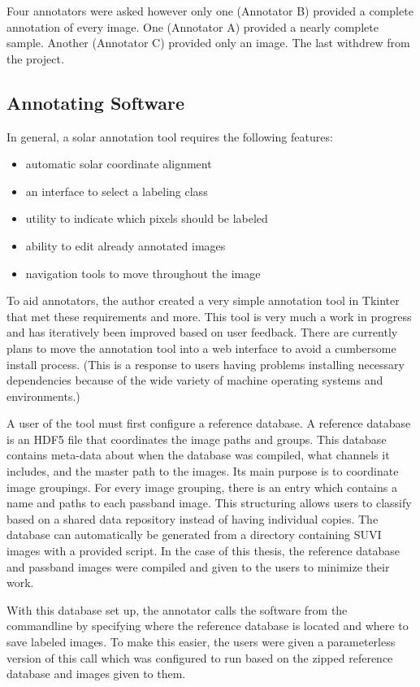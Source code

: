 \documentclass[twoside]{report}
\begin{document}
Four annotators were asked however only one (Annotator B) provided a complete annotation of every image. One (Annotator A) provided a nearly complete sample. Another (Annotator C) provided only an image. The last withdrew from the project. 

\subsection{Annotating Software}\label{sec:annotatesoftware}
In general, a solar annotation tool requires the following features:
\begin{itemize}
\item automatic solar coordinate alignment 
\item an interface to select a labeling class
\item utility to indicate which pixels should be labeled
\item ability to edit already annotated images
\item navigation tools to move throughout the image
\end{itemize}

To aid annotators, the author created a very simple annotation tool in Tkinter that met these requirements and more. This tool is very much a work in progress and has iteratively been improved based on user feedback. There are currently plans to move the annotation tool into a web interface to avoid a cumbersome install process. (This is a response to users having problems installing necessary dependencies because of the wide variety of machine operating systems and environments.) 

A user of the tool must first configure a reference database. A reference database is an HDF5 file that coordinates the image paths and groups. This database contains meta-data about when the database was compiled, what channels it includes, and the master path to the images. Its main purpose is to coordinate image groupings. For every image grouping, there is an entry which contains a name and paths to each passband image. This structuring allows users to classify based on a shared data repository instead of having individual copies. The database can automatically be generated from a directory containing SUVI images with a provided script. In the case of this thesis, the reference database and passband images were compiled and given to the users to minimize their work. 

With this database set up, the annotator calls the software from the commandline by specifying where the reference database is located and where to save labeled images. To make this easier, the users were given a parameterless version of this call which was configured to run based on the zipped reference database and images given to them. 
\end{document}
